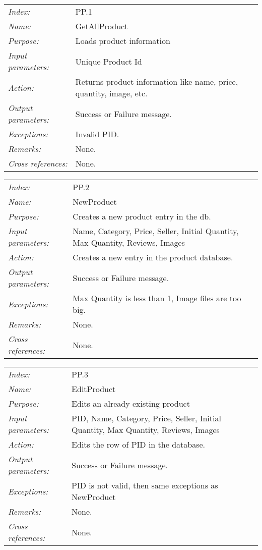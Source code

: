 \documentclass[10pt,letter]{article}
\begin{document}
\begin{tabularx}{\textwidth}{l X}
    \it{Index:} & PP.1 \\
    \it{Name:} & GetAllProduct \\
    \it{Purpose:} & Loads product information \\
    \it{Input parameters:} & Unique Product Id \\
    \it{Action:} & Returns product information like name, price, quantity, image, etc.\\
    \it{Output parameters:} & Success or Failure message. \\
    \it{Exceptions:} & Invalid PID. \\
    \it{Remarks:} & None. \\
    \it{Cross references:} & None. \\
    \hline
\end{tabularx}

\begin{tabularx}{\textwidth}{l X}
    \it{Index:} & PP.2 \\
    \it{Name:} & NewProduct \\
    \it{Purpose:} & Creates a new product entry in the db.\\
    \it{Input parameters:} & Name, Category, Price, Seller, Initial Quantity, Max Quantity, Reviews, Images\\
    \it{Action:} & Creates a new entry in the product database.\\
    \it{Output parameters:} & Success or Failure message. \\
    \it{Exceptions:} & Max Quantity is less than 1, Image files are too big. \\
    \it{Remarks:} & None. \\
    \it{Cross references:} & None. \\
    \hline
\end{tabularx}

\begin{tabularx}{\textwidth}{l X}
    \it{Index:} & PP.3 \\
    \it{Name:} & EditProduct \\
    \it{Purpose:} & Edits an already existing product \\
    \it{Input parameters:} & PID, Name, Category, Price, Seller, Initial Quantity, Max Quantity, Reviews, Images\\
    \it{Action:} & Edits the row of PID in the database.\\
    \it{Output parameters:} & Success or Failure message. \\
    \it{Exceptions:} & PID is not valid, then same exceptions as NewProduct \\
    \it{Remarks:} & None. \\
    \it{Cross references:} & None. \\
    \hline
\end{tabularx}
\end{document}
